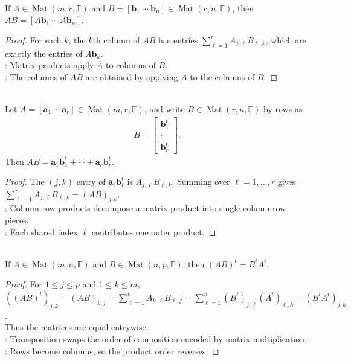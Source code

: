 \begin{proposition} \label{prop:matrix-product-by-columns} \\
If $A\in\operatorname{Mat}(m,r,\mathbb{F})$ and $B=[\mathbf{b}_1\ \cdots\ \mathbf{b}_n]\in\operatorname{Mat}(r,n,\mathbb{F})$, then $AB=[A\mathbf{b}_1\ \cdots\ A\mathbf{b}_n]$.
\begin{proof}
For each $k$, the $k$th column of $AB$ has entries $\sum_{\ell=1}^r A_{j,\ell}B_{\ell,k}$, which are exactly the entries of $A\mathbf{b}_k$.\\
: Matrix products apply $A$ to columns of $B$.\\
: The columns of $AB$ are obtained by applying $A$ to the columns of $B$.
\end{proof}
\end{proposition}

\begin{proposition} \label{prop:matrix-product-outer-product-decomposition} \\
Let $A=[\mathbf{a}_1\ \cdots\ \mathbf{a}_r]\in\operatorname{Mat}(m,r,\mathbb{F})$, and write $B\in\operatorname{Mat}(r,n,\mathbb{F})$ by rows as
\begin{align}
B=
\begin{bmatrix}
\mathbf{b}_1^t\\
\vdots\\
\mathbf{b}_r^t
\end{bmatrix}.
\nonumber
\end{align}
Then $AB=\mathbf{a}_1\mathbf{b}_1^t+\cdots+\mathbf{a}_r\mathbf{b}_r^t$.
\begin{proof}
The $(j,k)$ entry of $\mathbf{a}_\ell\mathbf{b}_\ell^t$ is $A_{j,\ell}B_{\ell,k}$. Summing over $\ell=1,\ldots,r$ gives $\sum_{\ell=1}^r A_{j,\ell}B_{\ell,k}=(AB)_{j,k}$.\\
: Column-row products decompose a matrix product into single column-row pieces.\\
: Each shared index $\ell$ contributes one outer product.
\end{proof}
\end{proposition}

\begin{proposition} \label{prop:transpose-reverses-products} \\
If $A\in\operatorname{Mat}(m,n,\mathbb{F})$ and $B\in\operatorname{Mat}(n,p,\mathbb{F})$, then $(AB)^t=B^tA^t$.
\begin{proof}
For $1\leq j\leq p$ and $1\leq k\leq m$, $((AB)^t)_{j,k}=(AB)_{k,j}=\sum\limits_{\ell=1}^n A_{k,\ell}B_{\ell,j}=\sum\limits_{\ell=1}^n (B^t)_{j,\ell}(A^t)_{\ell,k}=(B^tA^t)_{j,k}$.\\
Thus the matrices are equal entrywise.\\
: Transposition swaps the order of composition encoded by matrix multiplication.\\
: Rows become columns, so the product order reverses.
\end{proof}
\end{proposition}

